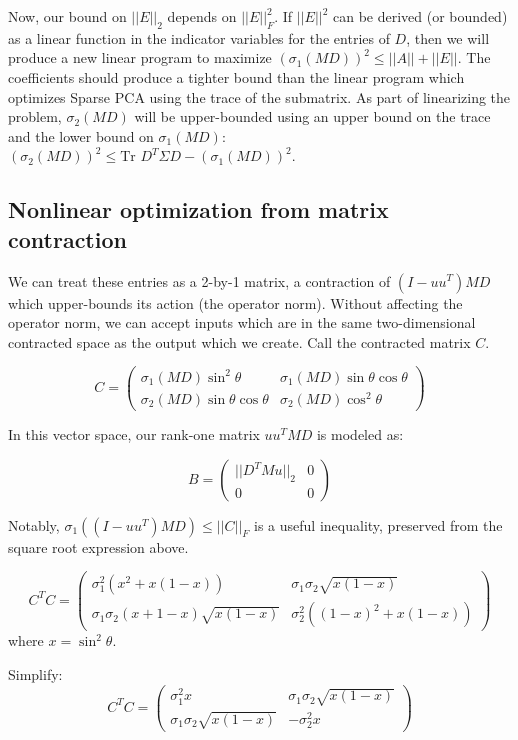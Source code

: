 \documentclass{article}
\begin{document}
Now, our bound on $||E||_2$ depends on $||E||_F^2$.
If $||E||^2$ can be derived (or bounded) as a linear function in the indicator variables for the entries of $D$, then we will produce a new linear program to maximize $(\sigma_1(MD))^2 \le ||A|| + ||E||$. The coefficients should produce a tighter bound than the linear program which optimizes Sparse PCA using the trace of the submatrix. As part of linearizing the problem, $\sigma_2(MD)$ will be upper-bounded using an upper bound on the trace and the lower bound on $\sigma_1(MD)$: $(\sigma_2(MD))^2 \le \text{Tr } D^T\Sigma D - (\sigma_1(MD))^2$.

\subsection{Nonlinear optimization from matrix contraction}

We can treat these entries as a 2-by-1 matrix, a contraction of $(I-uu^T)MD$ which upper-bounds its action (the operator norm). Without affecting the operator norm, we can accept inputs which are in the same two-dimensional contracted space as the output which we create. Call the contracted matrix $C$.

$$C =
\left(
    \begin{matrix}
        \sigma_1(MD) \sin^2\theta
        &
        \sigma_1(MD) \sin\theta\cos\theta
        \\
        \sigma_2(MD) \sin\theta\cos\theta
        &
        \sigma_2(MD) \cos^2\theta
    \end{matrix}
\right)
$$

In this vector space, our rank-one matrix $uu^TMD$ is modeled as:

$$B =
\left(
    \begin{matrix}
        ||D^TMu||_2 & 0 \\ 0 & 0
    \end{matrix}
\right)
$$

Notably, $\sigma_1((I-uu^T) MD) \le ||C||_F$ is a useful inequality, preserved from the square root expression above.

$$
C^T C
=
\left(
    \begin{matrix}
        \sigma_1^2 (x^2 + x(1-x)) & \sigma_1\sigma_2 \sqrt{x(1-x)}
        \\
        \sigma_1\sigma_2 (x+1-x) \sqrt{x(1-x)} & \sigma_2^2 ((1-x)^2 + x(1-x))
    \end{matrix}
\right)
$$
where $x = \sin^2 \theta$.

Simplify:
$$
C^T C
=
\left(
    \begin{matrix}
        \sigma_1^2 x & \sigma_1\sigma_2 \sqrt{x(1-x)}
        \\
        \sigma_1\sigma_2 \sqrt{x(1-x)} & -\sigma_2^2 x
    \end{matrix}
\right)
$$
\end{document}
